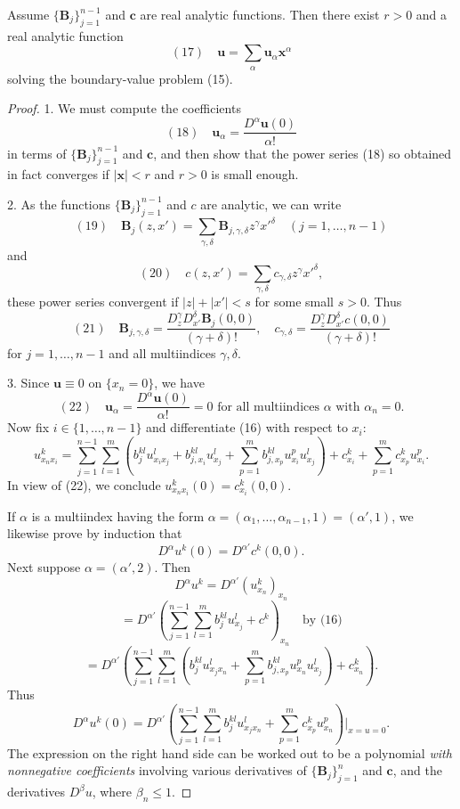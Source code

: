 \begin{theorem}
\label{thm:cauchy-kovalevskaya}
Assume $\{\mathbf{B}_j\}_{j=1}^{n-1}$ and $\mathbf{c}$ are real analytic functions. Then there exist $r > 0$ and a real analytic function
$$(17) \quad \mathbf{u} = \sum_{\alpha} \mathbf{u}_\alpha \mathbf{x}^\alpha$$
solving the boundary-value problem (15).
\end{theorem}
\begin{proof}
1. We must compute the coefficients
$$(18) \quad \mathbf{u}_\alpha = \frac{D^\alpha \mathbf{u}(0)}{\alpha!}$$
in terms of $\{\mathbf{B}_j\}_{j=1}^{n-1}$ and $\mathbf{c}$, and then show that the power series (18) so obtained in fact converges if $|\mathbf{x}| < r$ and $r > 0$ is small enough.

2. As the functions $\{\mathbf{B}_j\}_{j=1}^{n-1}$ and $c$ are analytic, we can write
$$(19) \quad \mathbf{B}_j(z,x') = \sum_{\gamma,\delta} \mathbf{B}_{j,\gamma,\delta}z^\gamma x'^\delta \quad (j = 1, \ldots, n-1)$$
and
$$(20) \quad c(z,x') = \sum_{\gamma,\delta} c_{\gamma,\delta}z^\gamma x'^\delta,$$
these power series convergent if $|z| + |x'| < s$ for some small $s > 0$. Thus
$$(21) \quad \mathbf{B}_{j,\gamma,\delta} = \frac{D_z^\gamma D_{x'}^\delta \mathbf{B}_j(0,0)}{(\gamma + \delta)!}, \quad c_{\gamma,\delta} = \frac{D_z^\gamma D_{x'}^\delta c(0,0)}{(\gamma + \delta)!}$$
for $j = 1, \ldots, n-1$ and all multiindices $\gamma, \delta$.

3. Since $\mathbf{u} \equiv 0$ on $\{x_n = 0\}$, we have
$$(22) \quad \mathbf{u}_\alpha = \frac{D^\alpha \mathbf{u}(0)}{\alpha!} = 0 \text{ for all multiindices } \alpha \text{ with } \alpha_n = 0.$$
Now fix $i \in \{1, \ldots, n-1\}$ and differentiate (16) with respect to $x_i$:
$$u^k_{x_n x_i} = \sum_{j=1}^{n-1} \sum_{l=1}^m \left( b_j^{kl} u_{x_i x_j}^l + b_{j,x_i}^{kl} u_{x_j}^l + \sum_{p=1}^m b_{j,x_p}^{kl} u_{x_i}^p u_{x_j}^l \right) + c_{x_i}^k + \sum_{p=1}^m c_{x_p}^k u_{x_i}^p.$$
In view of (22), we conclude $u^k_{x_n x_i}(0) = c_{x_i}^k(0,0)$.

If $\alpha$ is a multiindex having the form $\alpha = (\alpha_1, \ldots, \alpha_{n-1}, 1) = (\alpha', 1)$, we likewise prove by induction that
$$D^\alpha u^k(0) = D^{\alpha'}c^k(0,0).$$
Next suppose $\alpha = (\alpha', 2)$. Then
$$D^\alpha u^k = D^{\alpha'}(u^k_{x_n})_{x_n}$$
$$= D^{\alpha'} \left( \sum_{j=1}^{n-1} \sum_{l=1}^m b_j^{kl} u_{x_j}^l + c^k \right)_{x_n} \quad \text{by (16)}$$
$$= D^{\alpha'} \left( \sum_{j=1}^{n-1} \sum_{l=1}^m \left(b_j^{kl} u_{x_j x_n}^l + \sum_{p=1}^m b_{j,x_p}^{kl} u_{x_n}^p u_{x_j}^l\right) + c_{x_n}^k \right).$$
Thus
$$D^\alpha u^k(0) = D^{\alpha'} \left( \sum_{j=1}^{n-1} \sum_{l=1}^m b_j^{kl} u_{x_j x_n}^l + \sum_{p=1}^m c_{x_p}^k u_{x_n}^p \right) \bigg|_{x=u=0}.$$
The expression on the right hand side can be worked out to be a polynomial \textit{with nonnegative coefficients} involving various derivatives of $\{\mathbf{B}_j\}_{j=1}^n$ and $\mathbf{c}$, and the derivatives $D^\beta u$, where $\beta_n \leq 1$.


\end{proof}
